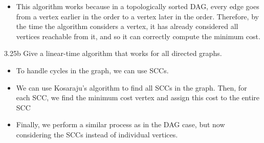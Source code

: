 \documentclass[boxes]{rutgers_hw}
\begin{document}
    \begin{itemize}
        \item This algorithm works because in a topologically sorted DAG, every edge goes from a vertex earlier in the order to a vertex later in the order. 
        Therefore, by the time the algorithm considers a vertex, it has already considered all vertices reachable from it, and so it can correctly compute the minimum cost.
    \end{itemize}

    \pagebreak

    \begin{exern}{3.25b}
        Give a linear-time algorithm that works for all directed graphs.
    \end{exern}

    \begin{itemize}
        \item To handle cycles in the graph, we can use SCCs. 
        \item We can use Kosaraju's algorithm to find all SCCs in the graph. Then, for each SCC, we find the minimum cost vertex and assign this cost to the entire SCC
        \item Finally, we perform a similar process as in the DAG case, but now considering the SCCs instead of individual vertices.
    \end{itemize}

    \begin{algorithmic}
                    \EndIf{}
                \EndFor{}
                \EndFor{}
            \EndFor{}
                    \EndIf{}
                \EndFor{}
            \EndFor{}
        \EndProcedure{}
    \end{algorithmic}
\end{document}
